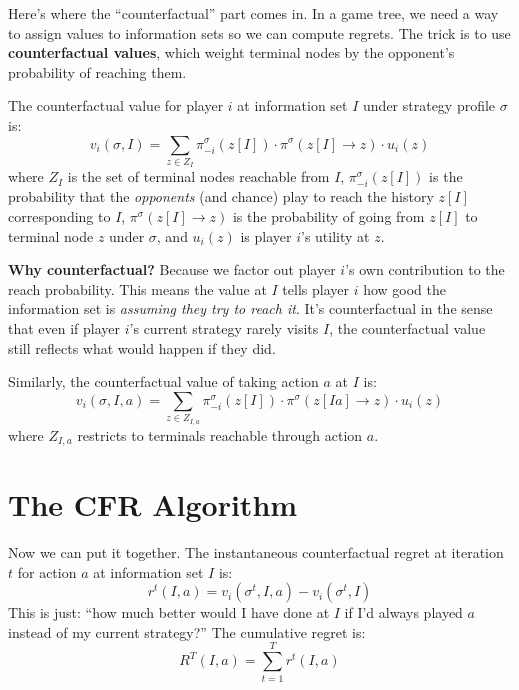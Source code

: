 \documentclass[11pt]{article}
\begin{document}
Here's where the ``counterfactual'' part comes in. In a game tree, we need a way to assign values to information sets so we can compute regrets. The trick is to use \textbf{counterfactual values}, which weight terminal nodes by the opponent's probability of reaching them.

The counterfactual value for player $i$ at information set $I$ under strategy profile $\sigma$ is:
\begin{equation}
    v_i(\sigma, I) = \sum_{z \in Z_I} \pi_{-i}^{\sigma}(z[I]) \cdot \pi^{\sigma}(z[I] \to z) \cdot u_i(z)
\end{equation}
where $Z_I$ is the set of terminal nodes reachable from $I$, $\pi_{-i}^{\sigma}(z[I])$ is the probability that the \textit{opponents} (and chance) play to reach the history $z[I]$ corresponding to $I$, $\pi^{\sigma}(z[I] \to z)$ is the probability of going from $z[I]$ to terminal node $z$ under $\sigma$, and $u_i(z)$ is player $i$'s utility at $z$.

\textbf{Why counterfactual?} Because we factor out player $i$'s own contribution to the reach probability. This means the value at $I$ tells player $i$ how good the information set is \textit{assuming they try to reach it}. It's counterfactual in the sense that even if player $i$'s current strategy rarely visits $I$, the counterfactual value still reflects what would happen if they did.

Similarly, the counterfactual value of taking action $a$ at $I$ is:
\begin{equation}
    v_i(\sigma, I, a) = \sum_{z \in Z_{I,a}} \pi_{-i}^{\sigma}(z[I]) \cdot \pi^{\sigma}(z[Ia] \to z) \cdot u_i(z)
\end{equation}
where $Z_{I,a}$ restricts to terminals reachable through action $a$.

\section{The CFR Algorithm}

Now we can put it together. The instantaneous counterfactual regret at iteration $t$ for action $a$ at information set $I$ is:
\begin{equation}
    r^t(I, a) = v_i(\sigma^t, I, a) - v_i(\sigma^t, I)
\end{equation}
This is just: ``how much better would I have done at $I$ if I'd always played $a$ instead of my current strategy?'' The cumulative regret is:
\begin{equation}
    R^T(I, a) = \sum_{t=1}^{T} r^t(I, a)
\end{equation}
\end{document}
